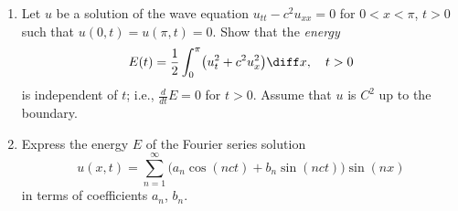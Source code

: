 \newpage
\begin{problem}
  \begin{enumerate}[label=(\alph*),noitemsep]
  \item Let \(u\) be a solution of the wave equation \(u_{tt}-c^2u_{xx}=0\)
    for \(0<x<\pi\), \(t>0\) such that \(u(0,t)=u(\pi,t)=0\). Show that the
    \emph{energy}
    \[
      E(t)=\frac{1}{2}\int_0^\pi \bigl(u_t^2+c^2u_x^2 \bigr)\diff x,\quad t>0
    \]
    is independent of \(t\); i.e., \(\frac{d}{dt}E=0\) for \(t>0\). Assume that
    \(u\) is \(C^2\) up to the boundary.
  \item Express the energy \(E\) of the Fourier series solution
    \[
      u(x,t)=\sum_{n=1}^\infty
      \bigl(a_n\cos(nct)+b_n\sin(nct)\bigr)\sin(nx)
    \]
    in terms of coefficients \(a_n\), \(b_n\).
  \end{enumerate}
\end{problem}
